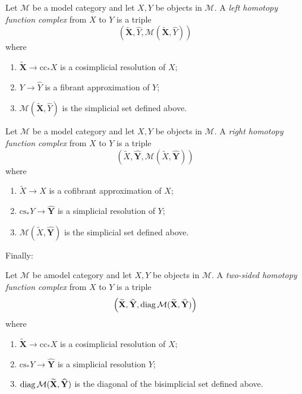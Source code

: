 \begin{defin}
Let $\mathcal M$ be a model category and let $X,Y$ be objects in $\mathcal M$. A \emph{left homotopy function complex} from $X$ to $Y$ is a triple
\[
\left( \widetilde{\mathbf X}, \widehat{Y}, \mathcal M( \widetilde{\mathbf X}, \widehat{Y}) \right)
\]
where
\begin{enumerate}
\item $\widetilde{\mathbf X} \to \mathrm{cc}_* X$ is a cosimplicial resolution of $X$;
\item $Y \to \widehat{Y}$ is a fibrant approximation of $Y$;
\item $\mathcal M(\widetilde{\mathbf X}, \widehat{Y})$ is the simplicial set defined above.
\end{enumerate}
\end{defin}

\begin{defin}
Let $\mathcal M$ be a model category and let $X,Y$ be objects in $\mathcal M$. A \emph{right homotopy function complex} from $X$ to $Y$ is a triple
\[
\left( \widetilde{X}, \widehat{\mathbf Y}, \mathcal M(\widetilde{X}, \widehat{\mathbf Y}) \right)
\]
where
\begin{enumerate}
\item $\widetilde{X} \to X$ is a cofibrant approximation of $X$;
\item $\mathrm{cs}_* Y \to \widehat{\mathbf Y}$ is a simplicial resolution of $Y$;
\item $\mathcal M(\widetilde{X}, \widehat{\mathbf Y})$ is the simplicial set defined above.
\end{enumerate}
\end{defin}

Finally:

\begin{defin}
Let $\mathcal M$ be amodel category and let $X,Y$ be objects in $\mathcal M$. A \emph{two-sided homotopy function complex} from $X$ to $Y$ is a triple
\[
\left( \widetilde{\mathbf X}, \widehat{\mathbf Y}, \mathrm{diag} \, \mathcal M(\widetilde{\mathbf X}, \widehat{\mathbf Y}) \right)
\]
where
\begin{enumerate}
\item $\widetilde{\mathbf X} \to \mathrm{cc}_* X$ is a cosimplicial resolution of $X$;
\item $\mathrm{cs}_* Y \to \widehat{\mathbf Y}$ is a simplicial resolution $Y$;
\item $\mathrm{diag} \, \mathcal M(\widetilde{\mathbf X}, \widehat{\mathbf Y})$ is the diagonal of the bisimplicial set defined above.
\end{enumerate}
\end{defin}


